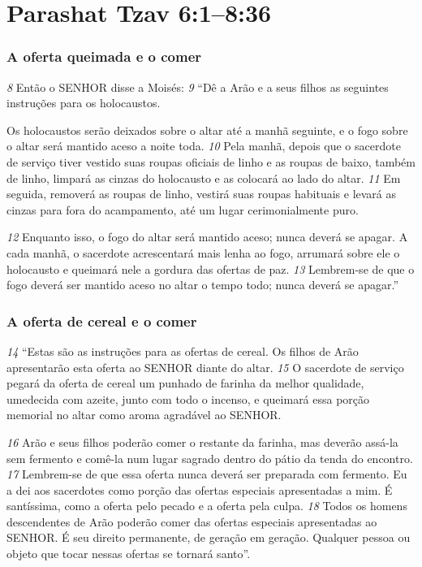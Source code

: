 \section*{Parashat Tzav 6:1–8:36}
\subsubsection*{A oferta queimada e o comer}  
\textit{\tiny 8} 
Então o SENHOR disse a Moisés: 
\textit{\tiny 9} 
“Dê a Arão e a seus filhos as seguintes
instruções para os holocaustos. 

\smallskip
Os holocaustos serão deixados sobre o altar até a
manhã seguinte, e o fogo sobre o altar será mantido aceso a noite toda. 
\textit{\tiny 10}
Pela
manhã, depois que o sacerdote de serviço tiver vestido suas roupas oficiais de
linho e as roupas de baixo, também de linho, limpará as cinzas do holocausto e as
colocará ao lado do altar. 
\textit{\tiny 11}
Em seguida, removerá as roupas de linho, vestirá suas
roupas habituais e levará as cinzas para fora do acampamento, até um lugar
cerimonialmente puro. 

\smallskip
\textit{\tiny 12}
Enquanto isso, o fogo do altar será mantido aceso;
nunca deverá se apagar. A cada manhã, o sacerdote acrescentará mais lenha ao
fogo, arrumará sobre ele o holocausto e queimará nele a gordura das ofertas de
paz. 
\textit{\tiny 13}
Lembrem-se de que o fogo deverá ser mantido aceso no altar o tempo todo;
nunca deverá se apagar.”

\bigskip
\subsubsection*{A oferta de cereal e o comer}  
\textit{\tiny 14}
“Estas são as instruções para as ofertas de cereal. Os filhos de Arão
apresentarão esta oferta ao SENHOR diante do altar. 
\textit{\tiny 15}
O sacerdote de serviço
pegará da oferta de cereal um punhado de farinha da melhor qualidade,
umedecida com azeite, junto com todo o incenso, e queimará essa porção
memorial no altar como aroma agradável ao SENHOR. 

\smallskip
\textit{\tiny 16}
Arão e seus filhos poderão
comer o restante da farinha, mas deverão assá-la sem fermento e comê-la num
lugar sagrado dentro do pátio da tenda do encontro. 
\textit{\tiny 17}
Lembrem-se de que essa
oferta nunca deverá ser preparada com fermento. Eu a dei aos sacerdotes como
porção das ofertas especiais apresentadas a mim. É santíssima, como a oferta pelo
pecado e a oferta pela culpa. 
\textit{\tiny 18}
Todos os homens descendentes de Arão poderão
comer das ofertas especiais apresentadas ao SENHOR. É seu direito permanente, de
geração em geração. Qualquer pessoa ou objeto que tocar nessas ofertas se
tornará santo”.

